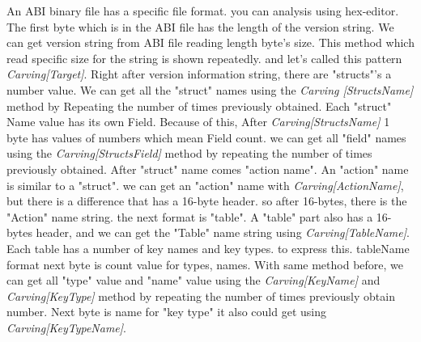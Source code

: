 An ABI binary file has a specific file format. you can analysis using hex-editor. 
The first byte which is in the ABI file has the length of the version string. We can get version string from ABI file reading length byte's size. This method which read specific size for the string is shown repeatedly. and let's called this pattern  \textit{Carving[Target]}. Right after version information string, there are "structs"'s a number value. We can get all the "struct" names using the \textit {Carving [StructsName]} method by Repeating the number of times previously obtained.
Each "struct" Name value has its own Field.
Because of this, After \textit{Carving[StructsName]} 1 byte has values of numbers which mean Field count. we can get all "field" names using the \textit{Carving[StructsField]} method by repeating the number of times previously obtained. 
After "struct" name comes "action name". 
An "action" name is similar to a "struct". we can get an "action" name with \textit{Carving[ActionName]}, but there is a difference that has a 16-byte header. so after 16-bytes, there is the "Action" name string.
the next format is "table".
A "table" part also has a 16-bytes header, and we can get the "Table" name string using \textit{Carving[TableName]}.
Each table has a number of key names and key types. to express this. tableName format next byte is count value for types, names. With same method before, we can get all "type" value and "name" value using the \textit{Carving[KeyName]} and \textit{Carving[KeyType]} method by repeating the number of times previously obtain number. Next byte is name for "key type" it also could get using \textit{Carving[KeyTypeName]}.



